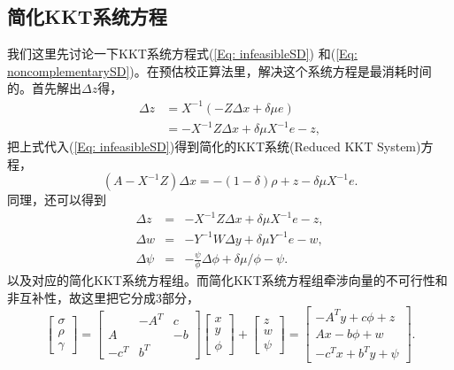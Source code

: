 \documentclass{ctexart}
\numberwithin{equation}{section} %
\begin{document}
\subsection{简化KKT系统方程}

我们这里先讨论一下KKT系统方程式(\ref{Eq: infeasibleSD})
和(\ref{Eq: noncomplementarySD})。在预估校正算法里，解决这个系统方程是最消耗时间的。首先解出$ \Delta z $得，
\begin{equation}
	\label{Eq: reducedKKTSystem.a}
	\begin{aligned}
		\Delta z & = X^{-1}\left(-Z\Delta x + \delta\mu e\right) \\
		& = -X^{-1}Z\Delta x + \delta\mu X^{-1}e - z,
	\end{aligned}
\end{equation}
把上式代入(\ref{Eq: infeasibleSD})得到简化的KKT系统(Reduced KKT System)方程，
\begin{equation}
	\left(A - X^{-1}Z\right)\Delta x = -\left(1- \delta\right)\rho + z - \delta\mu X^{-1}e. \nonumber
\end{equation}
同理，还可以得到
\begin{eqnarray}
	\Delta z & = & -X^{-1}Z\Delta x + \delta\mu X^{-1}e - z, \\
	\Delta w & = &-Y^{-1}W\Delta y + \delta\mu Y^{-1}e - w, \\
	\Delta \psi & = & -\frac{\psi}{\phi}\Delta \phi + \delta\mu/\phi - \psi.
\end{eqnarray}
以及对应的简化KKT系统方程组。而简化KKT系统方程组牵涉向量的不可行性和非互补性，故这里把它分成3部分，
\begin{equation}
	\begin{bmatrix}
		\sigma \\ \rho \\ \gamma
	\end{bmatrix}
	= \begin{bmatrix}
		& -A^T & c \\
		A & & -b \\
		-c^T & b^T & 
	\end{bmatrix}
	\begin{bmatrix}
		x \\ y \\ \phi
	\end{bmatrix}
	+ \begin{bmatrix}
		z \\ w \\ \psi
	\end{bmatrix}
	= \begin{bmatrix}
		-A^Ty + c\phi + z \\
		Ax - b\phi + w \\
		-c^Tx + b^Ty + \psi
	\end{bmatrix}. \nonumber
\end{equation}
\end{document}
